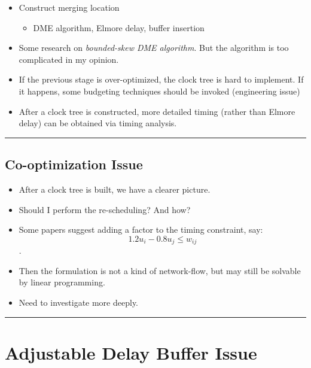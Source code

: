 \documentclass[
]{article}
\providecommand{\tightlist}{%
  \setlength{\itemsep}{0pt}\setlength{\parskip}{0pt}}
\begin{document}
\begin{itemize}
\tightlist
\item
  Construct merging location

  \begin{itemize}
  \tightlist
  \item
    DME algorithm, Elmore delay, buffer insertion
  \end{itemize}
\item
  Some research on \emph{bounded-skew DME algorithm}. But the algorithm is
  too complicated in my opinion.
\item
  If the previous stage is over-optimized, the clock tree is hard to
  implement. If it happens, some budgeting techniques should be
  invoked (engineering issue)
\item
  After a clock tree is constructed, more detailed timing (rather than
  Elmore delay) can be obtained via timing analysis.
\end{itemize}

\begin{center}\rule{0.5\linewidth}{0.5pt}\end{center}

\subsection{Co-optimization Issue}\label{co-optimization-issue}

\begin{itemize}
\tightlist
\item
  After a clock tree is built, we have a clearer picture.
\item
  Should I perform the re-scheduling? And how?
\item
  Some papers suggest adding a factor to the timing constraint, say:
  \[1.2 u_i - 0.8 u_j \leq w_{ij}\].
\item
  Then the formulation is not a kind of network-flow, but may still be
  solvable by linear programming.
\item
  Need to investigate more deeply.
\end{itemize}

\begin{center}\rule{0.5\linewidth}{0.5pt}\end{center}

\section{Adjustable Delay Buffer Issue}\label{adjustable-delay-buffer-issue}
\end{document}

